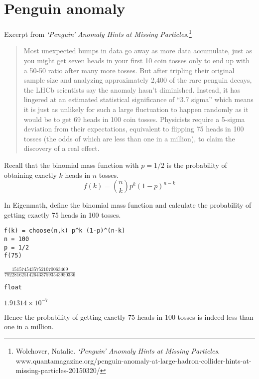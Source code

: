 

\section*{Penguin anomaly}

Excerpt from {\it `Penguin' Anomaly Hints at Missing Particles}.\footnote{
Wolchover, Natalie.
{\it `Penguin' Anomaly Hints at Missing Particles.}\\
www.quantamagazine.org/penguin-anomaly-at-large-hadron-collider-hints-at-missing-particles-20150320/}

\begin{quote}
Most unexpected bumps in data go away as more data accumulate, just as you might get seven heads in your first 10 coin tosses only to end up with a 50-50 ratio after many more tosses. But after tripling their original sample size and analyzing approximately 2,400 of the rare penguin decays, the LHCb scientists say the anomaly hasn't diminished. Instead, it has lingered at an estimated statistical significance of ``3.7 sigma'' which means it is just as unlikely for such a large fluctuation to happen randomly as it would be to get 69 heads in 100 coin tosses. Physicists require a 5-sigma deviation from their expectations, equivalent to flipping 75 heads in 100 tosses (the odds of which are less than one in a million), to claim the discovery of a real effect.
\end{quote}

Recall that the binomial mass function with $p=1/2$
is the probability of obtaining exactly
$k$ heads in $n$ tosses.
\begin{equation*}
f(k)={n\choose k}p^k(1-p)^{n-k}
\end{equation*}

In Eigenmath, define the binomial mass function
and calculate the probability
of getting exactly 75 heads in 100 tosses.

{\color{blue}
\begin{verbatim}
f(k) = choose(n,k) p^k (1-p)^(n-k)
n = 100
p = 1/2
f(75)
\end{verbatim}}

$\frac{15157454357521070063469}{79228162514264337593543950336}$

{\color{blue}
\begin{verbatim}
float
\end{verbatim}}

$1.91314\times10^{-7}$

\bigskip
Hence the probability of getting exactly 75 heads in 100 tosses is indeed
less than one in a million.

